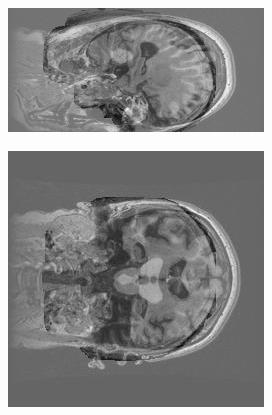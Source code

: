 \documentclass[11pt,a4paper,oneside]{report}
\begin{document}
\begin{figure}[H]
        \centering
        \begin{subfigure}[b]{0.3\textwidth}
                \includegraphics[width=\textwidth, height=0.8\textwidth, angle=90]{figures/diff/t1Init_x.jpg}
        \end{subfigure}%
        \begin{subfigure}[b]{0.3\textwidth}
                \includegraphics[width=\textwidth, angle=90]{figures/diff/t1Init_y.jpg}

\end{subfigure}
\end{figure}
\end{document}
